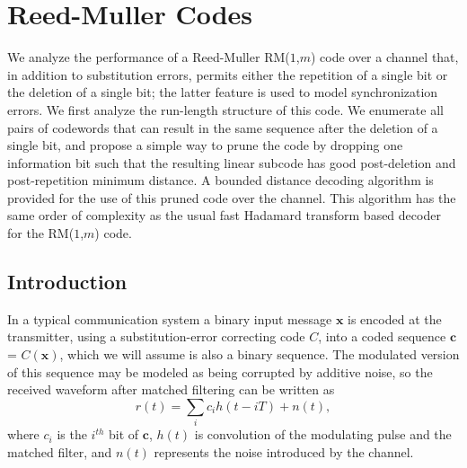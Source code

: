 \chapter[Reed-Muller Codes]{Reed-Muller Codes}
We analyze the performance of a Reed-Muller RM($1$,$m$) code over
a channel that, in addition to substitution errors, permits either
the repetition of a single bit or the deletion of a single bit;
the latter feature is used to model synchronization errors. We
first analyze the run-length structure of this code. We enumerate
all pairs of codewords that can result in the same sequence after
the deletion of a single bit, and propose a simple way to prune
the code by dropping one information bit such that the resulting
linear subcode has good post-deletion and post-repetition minimum
distance. A bounded distance decoding algorithm is provided for
the use of this pruned code over the channel. This algorithm has
the same order of complexity as the usual fast Hadamard transform
based decoder for the RM($1$,$m$) code.




%



\section{Introduction} \label{Intro}

In a typical communication system a binary input message
$\mathbf{x}$ is encoded at the transmitter, using a
substitution-error correcting code $C$, into a coded sequence
$\mathbf{c}$ = $C(\mathbf{x})$, which we will assume is also a
binary sequence. The modulated version of this sequence may be
modeled as being corrupted by additive noise, so the received
waveform after matched filtering  can be written as
\begin{equation}
r(t)=\sum_{i} c_i h(t-iT) +n(t),
\end{equation}
where $c_i$ is the $i^{th}$%
bit of $\mathbf{c}$, $h(t)$ is convolution
of the modulating pulse and the matched
filter,
and $n(t)$ represents the noise
introduced by the
channel.


